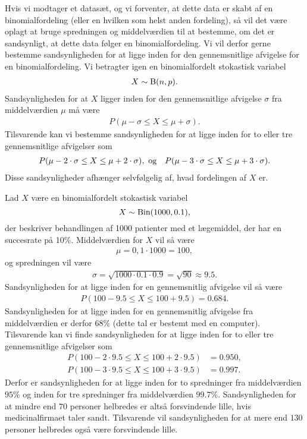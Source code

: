 Hvis vi modtager et datasæt, og vi forventer, at dette data er skabt af en binomialfordeling (eller en hvilken som helst anden fordeling), så vil det være oplagt at bruge spredningen og middelværdien til at bestemme, om det er sandsynligt, at dette data følger en binomialfordeling. Vi vil derfor gerne bestemme sandsynligheden for at ligge inden for den gennemsnitlige afvigelse for en binomialfordeling. Vi betragter igen en binomialfordelt stokastisk variabel 
\begin{align*}
X \sim \textnormal{B}(n,p).
\end{align*}
Sandsynligheden for at $X$ ligger inden for den gennemsnitlige afvigelse $\sigma$ fra middelværdien $\mu$ må være
\begin{align*}
P(\mu - \sigma \leq X \leq \mu + \sigma).
\end{align*}
Tilsvarende kan vi bestemme sandsynligheden for at ligge inden for to eller tre gennemsnitlige afvigelser som
\begin{align*}
&P(\mu - 2\cdot \sigma \leq X \leq \mu + 2\cdot \sigma), \textnormal{ og}
&P(\mu - 3\cdot \sigma \leq X \leq \mu + 3\cdot \sigma).
\end{align*}
Disse sandsynligheder afhænger selvfølgelig af, hvad fordelingen af $X$ er. 
\begin{exa}
Lad $X$ være en binomialfordelt stokastisk variabel
\[
X \sim \textnormal{Bin}(1000,0.1),
\]
der beskriver behandlingen af 1000 patienter med et lægemiddel, der har en succesrate på 10$\%$. Middelværdien for $X$ vil så være
\begin{align*}
	\mu = 0,1\cdot 1000 = 100,
\end{align*}
og spredningen vil være
\begin{align*}
	\sigma = \sqrt{1000\cdot 0.1 \cdot 0.9} = \sqrt{90} \approx 9.5.
\end{align*}
Sandsynligheden for at ligge inden for en gennemsnitlig afvigelse vil så være
\begin{align*}
	P(100-9.5 \leq X \leq 100+9.5) = 0.684.
\end{align*}
Sandsynligheden for at ligge inden for en gennemsnitlig afvigelse fra middelværdien er derfor $68\%$ (dette tal er bestemt med en computer). Tilsvarende kan vi finde sandsynligheden for at ligge inden for to eller tre gennemsnitlige afvigelser som
\begin{align*}
P(100-2\cdot 9.5 \leq X \leq 100+2\cdot 9.5 ) &= 0.950,\\
P(100-3\cdot 9.5 \leq X \leq 100+3\cdot 9.5) &= 0.997.
\end{align*}
Derfor er sandsynligheden for at ligge inden for to spredninger fra middelværdien $95\%$ og inden for tre spredninger fra middelværdien $99.7\%$. Sandsynligheden for at mindre end $70$ personer helbredes er altså forsvindende lille, hvis medicinalfirmaet taler sandt. Tilsvarende vil sandsynligheden for at mere end $130$ personer helbredes også være forsvindende lille. 
\end{exa}






